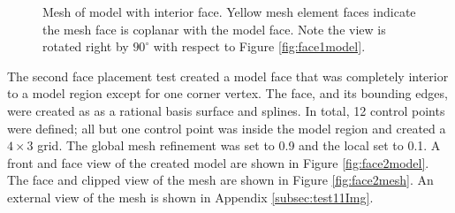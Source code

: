 \documentclass[a4paper, 12pt]{article}
\begin{document}
\begin{figure}[H]
  \centering
  \caption{Mesh of model with interior face.
        Yellow mesh element faces indicate the mesh face is 
        coplanar with the model face. Note the view is rotated 
        right by $90^{\circ}$ with respect to Figure \ref{fig:face1model}.}
  \label{fig:face1mesh}
\end{figure}

The second face placement test created a model face that was completely 
interior to a model region except for one corner vertex. 
The face, and its bounding edges,  were created as 
as a rational basis surface and splines. In total, 12 control points were 
defined; all but one control point was inside the model 
region and created a $4\times3$
grid. The global mesh refinement was set to 0.9 and the local set to 0.1. 
A front and face view of the created model 
are shown in Figure \ref{fig:face2model}.
The face and clipped view of the mesh are shown 
in Figure \ref{fig:face2mesh}.
An external view of the mesh is shown in Appendix \ref{subsec:test11Img}.
\end{document}
